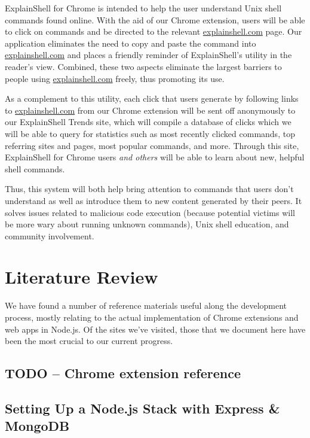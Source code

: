\documentclass[11pt]{article}
\begin{document}
ExplainShell for Chrome is intended to help the user understand Unix shell
commands found online. With the aid of our Chrome extension, users will be able
to click on commands and be directed to the relevant \url{explainshell.com} page.
Our application eliminates the need to copy and paste the command into
\url{explainshell.com} and places a friendly reminder of ExplainShell's utility
in the reader's view. Combined, these two aspects eliminate the largest
barriers to people using \url{explainshell.com} freely, thus promoting its use.

As a complement to this utility, each click that users generate by following
links to \url{explainshell.com} from our Chrome extension will be sent off
anonymously to our ExplainShell Trends site, which will compile a database of
clicks which we will be able to query for statistics such as most recently
clicked commands, top referring sites and pages, most popular commands, and
more. Through this site, ExplainShell for Chrome users \textit{and others} will
be able to learn about new, helpful shell commands.

Thus, this system will both help bring attention to commands that users don't
understand as well as introduce them to new content generated by their peers.
It solves issues related to malicious code execution (because potential victims
will be more wary about running unknown commands), Unix shell education, and
community involvement.

\section{Literature Review}

We have found a number of reference materials useful along the development
process, mostly relating to the actual implementation of Chrome extensions and
web apps in Node.js. Of the sites we've visited, those that we document here
have been the most crucial to our current progress.

\subsection{TODO -- Chrome extension reference}

\subsection{Setting Up a Node.js Stack with Express \& MongoDB}
\end{document}
